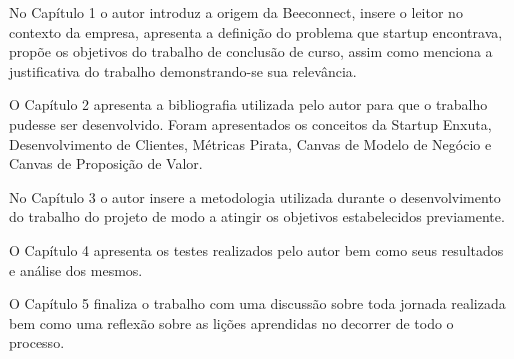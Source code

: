 No Capítulo 1 o autor introduz a origem da Beeconnect, insere o leitor no contexto da empresa, apresenta a definição do problema que startup encontrava, propõe os objetivos do trabalho de conclusão de curso, assim como menciona a justificativa do trabalho demonstrando-se sua relevância.

O Capítulo 2 apresenta a bibliografia utilizada pelo autor para que o trabalho pudesse ser desenvolvido. Foram apresentados os conceitos da Startup Enxuta, Desenvolvimento de Clientes, Métricas Pirata, Canvas de Modelo de Negócio e Canvas de Proposição de Valor.

No Capítulo 3 o autor insere a metodologia utilizada durante o desenvolvimento do trabalho do projeto de modo a atingir os objetivos estabelecidos previamente.

O Capítulo 4 apresenta os testes realizados pelo autor bem como seus resultados e análise dos mesmos.

O Capítulo 5 finaliza o trabalho com uma discussão sobre toda jornada realizada bem como uma reflexão sobre as lições aprendidas no decorrer de todo o processo.